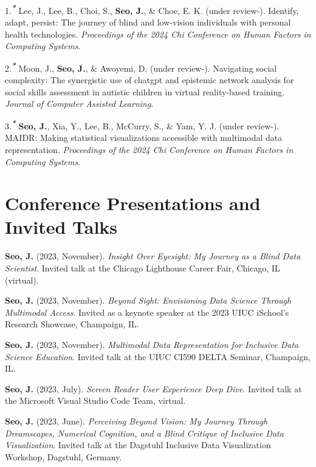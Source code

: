 \documentclass[11pt,a4paper,]{awesome-cv}
\begin{document}
\hypertarget{bibliography}{}
\leavevmode\hypertarget{ref-lee2024identify}{}%
1.\textsuperscript{\emph{\textbf{*}}} Lee, J., Lee, B., Choi, S.,
\textbf{Seo, J.}, \& Choe, E. K. (under review-). Identify, adapt,
persist: The journey of blind and low-vision individuals with personal
health technologies. \emph{Proceedings of the 2024 Chi Conference on
  Human Factors in Computing Systems}.

\leavevmode\hypertarget{ref-moon2023navigating}{}%
2.\textsuperscript{\emph{\textbf{*}}} Moon, J., \textbf{Seo, J.}, \&
Awoyemi, D. (under review-). Navigating social complexity: The
synergistic use of chatgpt and epistemic network analysis for social
skills assessment in autistic children in virtual reality-based
training. \emph{Journal of Computer Assisted Learning}.

\leavevmode\hypertarget{ref-seo2024maidr}{}%
3.\textsuperscript{\emph{\textbf{*}}} \textbf{Seo, J.}, Xia, Y., Lee,
B., McCurry, S., \& Yam, Y. J. (under review-). MAIDR: Making
statistical visualizations accessible with multimodal data
representation. \emph{Proceedings of the 2024 Chi Conference on Human
  Factors in Computing Systems}.

\hypertarget{conference-presentations-and-invited-talks}{%
  \section{Conference Presentations and Invited
    Talks}\label{conference-presentations-and-invited-talks}}

\textbf{Seo, J.} (2023, November). \emph{Insight Over Eyesight: My
  Journey as a Blind Data Scientist}. Invited talk at the Chicago
Lighthouse Career Fair, Chicago, IL (virtual).

\textbf{Seo, J.} (2023, November). \emph{Beyond Sight: Envisioning Data
  Science Through Multimodal Access}. Invited as a keynote speaker at the
2023 UIUC iSchool's Research Showcase, Champaign, IL.

\textbf{Seo, J.} (2023, November). \emph{Multimodal Data Representation
  for Inclusive Data Science Education}. Invited talk at the UIUC CI590
DELTA Seminar, Champaign, IL.

\textbf{Seo, J.} (2023, July). \emph{Screen Reader User Experience Deep
  Dive}. Invited talk at the Microsoft Visual Studio Code Team, virtual.

\textbf{Seo, J.} (2023, June). \emph{Perceiving Beyond Vision: My
  Journey Through Dreamscapes, Numerical Cognition, and a Blind Critique
  of Inclusive Data Visualization}. Invited talk at the Dagstuhl Inclusive
Data Visualization Workshop, Dagstuhl, Germany.
\end{document}
